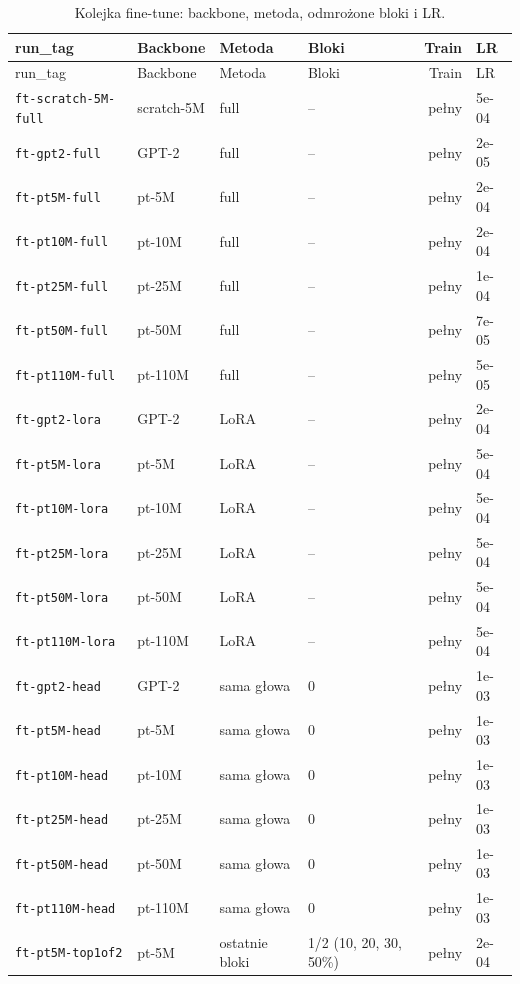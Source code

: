 {\small\setlength{\tabcolsep}{5pt}\setlength{\LTcapwidth}{\linewidth}
\begin{longtable}{@{}llllrl@{}}
\caption{Kolejka fine-tune: backbone, metoda, odmrożone bloki i LR.}\label{tab:grid}\\
\toprule
run\_tag & Backbone & Metoda & Bloki & Train & LR \\
\midrule
\endfirsthead
\toprule
run\_tag & Backbone & Metoda & Bloki & Train & LR \\
\midrule
\endhead
\bottomrule
\endlastfoot
\texttt{ft-scratch-5M-full} & scratch-5M & full & -- & pełny & 5e-04 \\
\texttt{ft-gpt2-full} & GPT-2 & full & -- & pełny & 2e-05 \\
\texttt{ft-pt5M-full} & pt-5M & full & -- & pełny & 2e-04 \\
\texttt{ft-pt10M-full} & pt-10M & full & -- & pełny & 2e-04 \\
\texttt{ft-pt25M-full} & pt-25M & full & -- & pełny & 1e-04 \\
\texttt{ft-pt50M-full} & pt-50M & full & -- & pełny & 7e-05 \\
\texttt{ft-pt110M-full} & pt-110M & full & -- & pełny & 5e-05 \\
\texttt{ft-gpt2-lora} & GPT-2 & LoRA & -- & pełny & 2e-04 \\
\texttt{ft-pt5M-lora} & pt-5M & LoRA & -- & pełny & 5e-04 \\
\texttt{ft-pt10M-lora} & pt-10M & LoRA & -- & pełny & 5e-04 \\
\texttt{ft-pt25M-lora} & pt-25M & LoRA & -- & pełny & 5e-04 \\
\texttt{ft-pt50M-lora} & pt-50M & LoRA & -- & pełny & 5e-04 \\
\texttt{ft-pt110M-lora} & pt-110M & LoRA & -- & pełny & 5e-04 \\
\texttt{ft-gpt2-head} & GPT-2 & sama głowa & 0 & pełny & 1e-03 \\
\texttt{ft-pt5M-head} & pt-5M & sama głowa & 0 & pełny & 1e-03 \\
\texttt{ft-pt10M-head} & pt-10M & sama głowa & 0 & pełny & 1e-03 \\
\texttt{ft-pt25M-head} & pt-25M & sama głowa & 0 & pełny & 1e-03 \\
\texttt{ft-pt50M-head} & pt-50M & sama głowa & 0 & pełny & 1e-03 \\
\texttt{ft-pt110M-head} & pt-110M & sama głowa & 0 & pełny & 1e-03 \\
\texttt{ft-pt5M-top1of2} & pt-5M & ostatnie bloki & 1/2 (10, 20, 30, 50\%) & pełny & 2e-04 \\

\end{longtable}}
